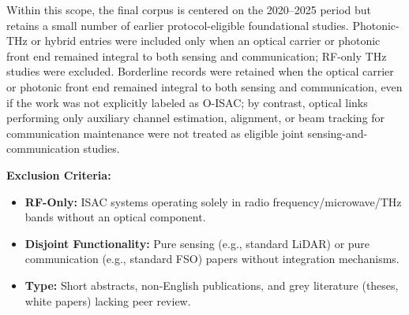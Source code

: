 \documentclass[letterpaper,journal]{IEEEtran}
\begin{document}
Within this scope, the final corpus is centered on the 2020--2025 period but retains a small number of earlier protocol-eligible foundational studies. Photonic-THz or hybrid entries were included only when an optical carrier or photonic front end remained integral to both sensing and communication; RF-only THz studies were excluded.
Borderline records were retained when the optical carrier or photonic front end remained integral to both sensing and communication, even if the work was not explicitly labeled as O-ISAC; by contrast, optical links performing only auxiliary channel estimation, alignment, or beam tracking for communication maintenance were not treated as eligible joint sensing-and-communication studies.

\textbf{Exclusion Criteria:}
\begin{itemize}
    \item \textbf{RF-Only:} ISAC systems operating solely in radio frequency/microwave/THz bands without an optical component.
    \item \textbf{Disjoint Functionality:} Pure sensing (e.g., standard LiDAR) or pure communication (e.g., standard FSO) papers without integration mechanisms.
    \item \textbf{Type:} Short abstracts, non-English publications, and grey literature (theses, white papers) lacking peer review.
\end{itemize}
\end{document}
